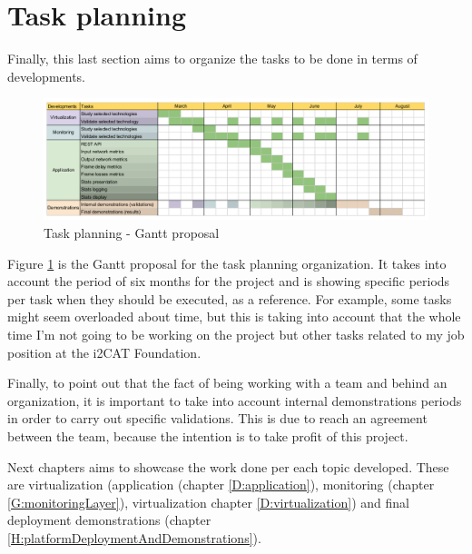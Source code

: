 \section{Task planning}

Finally, this last section aims to organize the tasks to be done in terms of developments. 

\begin{figure}[!htb]
\begin{center}
\includegraphics[width=1\textwidth]{./images/gantt.png}
\caption{Task planning - Gantt proposal}
\label{F:tpgp}
\end{center}
\end{figure}

Figure \ref{F:tpgp} is the Gantt proposal for the task planning organization. It takes into account the period of six months for the project and is showing specific periods per task when they should be executed, as a reference. For example, some tasks might seem overloaded about time, but this is taking into account that the whole time I'm not going to be working on the project but other tasks related to my job position at the i2CAT Foundation.

Finally, to point out that the fact of being working with a team and behind an organization, it is important to take into account internal demonstrations periods in order to carry out specific validations. This is due to reach an agreement between the team, because the intention is to take profit of this project.

Next chapters aims to showcase the work done per each topic developed. These are virtualization (application (chapter \ref{D:application}), monitoring (chapter \ref{G:monitoringLayer}), virtualization chapter \ref{D:virtualization}) and final deployment demonstrations (chapter \ref{H:platformDeploymentAndDemonstrations}). 
